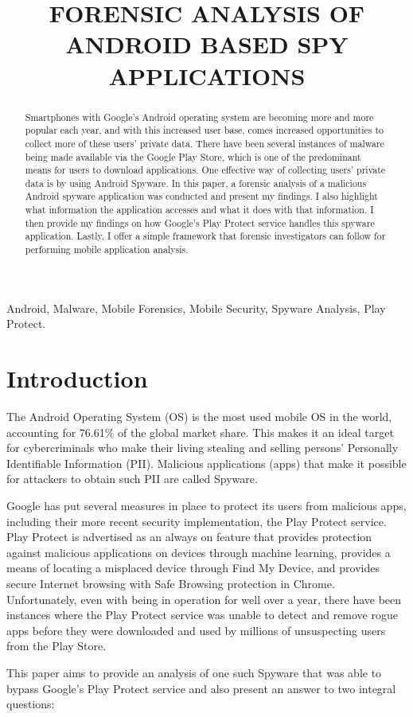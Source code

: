 \documentclass[conference]{IEEEtran}
\begin{document}
\title{FORENSIC ANALYSIS OF ANDROID BASED SPY APPLICATIONS}

\author{
}


\maketitle

\begin{abstract}
Smartphones with Google’s Android operating system are becoming more and more popular
each year, and with this increased user base, comes increased opportunities to collect more of
these users’ private data. There have been several instances of malware being made available
via the Google Play Store, which is one of the predominant means for users to download
applications. One effective way of collecting users’ private data is by using Android Spyware.
In this paper, a forensic analysis of a malicious Android spyware application was conducted and
present my findings. I also highlight what information the application accesses and what
it does with that information. I then provide my findings on how Google’s Play Protect
service handles this spyware application. Lastly, I offer a simple framework that forensic
investigators can follow for performing mobile application analysis.
\end{abstract}

\begin{IEEEkeywords}
Android, Malware, Mobile Forensics, Mobile Security, Spyware Analysis, Play Protect.
\end{IEEEkeywords}

\section{Introduction}
The Android Operating System (OS) is the most used mobile OS in the world, accounting for 76.61\% of the global market share. This makes it an ideal target for cybercriminals who make their living stealing and selling persons’ Personally Identifiable Information (PII). Malicious applications (apps) that make it possible for attackers to obtain such PII are called Spyware. 
\par Google has put several measures in place to protect its users from malicious apps, including their more recent security implementation, the Play Protect service. Play Protect is advertised as an always on feature that provides protection against malicious applications on devices through machine learning, provides a means of locating a misplaced device through Find My Device, and provides secure Internet browsing with Safe Browsing protection in Chrome. Unfortunately, even with being in operation for well over a year, there have been instances where the Play Protect service was unable to detect and remove rogue apps before they were downloaded and used by millions of unsuspecting users  from the Play Store. 
\par This paper aims to provide an analysis of one such Spyware that was able to bypass Google’s Play Protect service and also present an answer to two integral questions:
\end{document}
